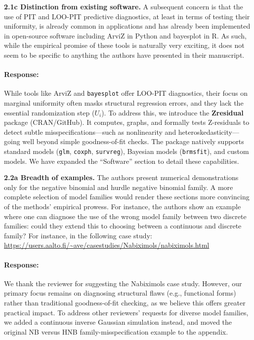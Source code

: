 \documentclass[11pt]{article}
\newcommand*{\mybox}[2]{%
  \par\medskip\noindent
  \colorbox{#1!30}{\parbox{.98\linewidth}{#2}}%
  \par\medskip
}
\begin{document}
 

\mybox{gray}{\textbf{2.1c Distinction from existing software.} A subsequent concern is that the use of PIT and LOO-PIT predictive diagnostics, at least in terms of testing their uniformity, is already common in applications and has already been implemented in open-source software including ArviZ in Python and bayesplot in R. As such, while the empirical promise of these tools is naturally very exciting, it does not seem to be specific to anything the authors have presented in their manuscript.}

\paragraph{Response:}
While tools like ArviZ and \texttt{bayesplot} offer LOO-PIT diagnostics, their focus on marginal uniformity often masks structural regression errors, and they lack the essential randomization step ($U_i$). To address this, we introduce the \textbf{Zresidual} package (CRAN/GitHub). It computes, graphs, and formally tests Z-residuals to detect subtle misspecifications---such as nonlinearity and heteroskedasticity---going well beyond simple goodness-of-fit checks. The package natively supports standard models (\texttt{glm}, \texttt{coxph}, \texttt{survreg}), Bayesian models (\texttt{brmsfit}), and custom models. We have expanded the ``Software'' section to detail these capabilities.



\mybox{gray}{\textbf{2.2a Breadth of examples.} The authors present numerical demonstrations only for the negative binomial and hurdle negative binomial family. A more complete selection of model families would render these sections more convincing of the methods' empirical prowess. For instance, the authors show an example where one can diagnose the use of the wrong model family between two discrete families: could they extend this to choosing between a continuous and discrete family? For instance, in the following case study:
\url{https://users.aalto.fi/~ave/casestudies/Nabiximols/nabiximols.html}}

\paragraph{Response:}

We thank the reviewer for suggesting the Nabiximols case study. However, our primary focus remains on diagnosing structural flaws (e.g., functional forms) rather than traditional goodness-of-fit checking, as we believe this offers greater practical impact. To address other reviewers' requests for diverse model families, we added a continuous inverse Gaussian simulation instead, and moved the original NB versus HNB family-misspecification example to the appendix. 
\end{document}
